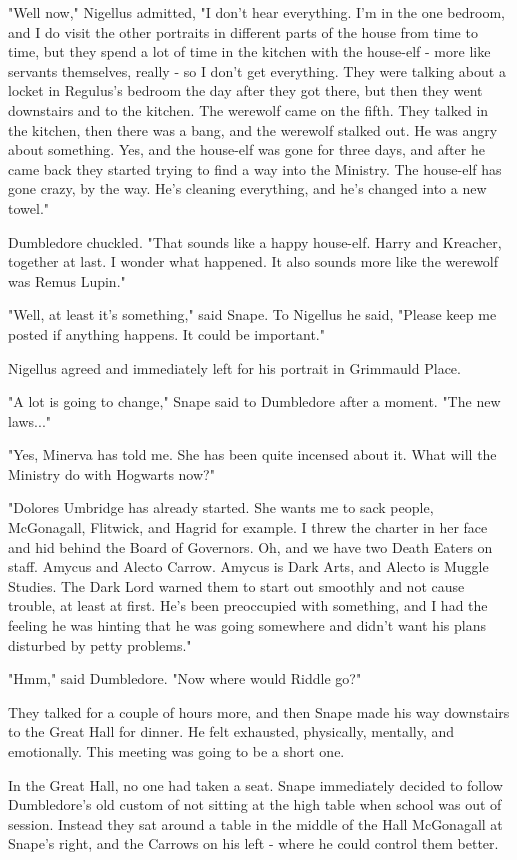 \documentclass[a4paper,11pt]{article}
\begin{document}
"Well now," Nigellus admitted, "I don't hear everything. I'm in the one bedroom, and I do visit the other portraits in different parts of the house from time to time, but they spend a lot of time in the kitchen with the house-elf - more like servants themselves, really - so I don't get everything. They were talking about a locket in Regulus's bedroom the day after they got there, but then they went downstairs and to the kitchen. The werewolf came on the fifth. They talked in the kitchen, then there was a bang, and the werewolf stalked out. He was angry about something. Yes, and the house-elf was gone for three days, and after he came back they started trying to find a way into the Ministry. The house-elf has gone crazy, by the way. He's cleaning everything, and he's changed into a new towel."

Dumbledore chuckled. "That sounds like a happy house-elf. Harry and Kreacher, together at last. I wonder what happened. It also sounds more like the werewolf was Remus Lupin."

"Well, at least it's something," said Snape. To Nigellus he said, "Please keep me posted if anything happens. It could be important."

Nigellus agreed and immediately left for his portrait in Grimmauld Place.

"A lot is going to change," Snape said to Dumbledore after a moment. "The new laws..."

"Yes, Minerva has told me. She has been quite incensed about it. What will the Ministry do with Hogwarts now?"

"Dolores Umbridge has already started. She wants me to sack people, McGonagall, Flitwick, and Hagrid for example. I threw the charter in her face and hid behind the Board of Governors. Oh, and we have two Death Eaters on staff. Amycus and Alecto Carrow. Amycus is Dark Arts, and Alecto is Muggle Studies. The Dark Lord warned them to start out smoothly and not cause trouble, at least at first. He's been preoccupied with something, and I had the feeling he was hinting that he was going somewhere and didn't want his plans disturbed by petty problems."

"Hmm," said Dumbledore. "Now where would Riddle go?"

They talked for a couple of hours more, and then Snape made his way downstairs to the Great Hall for dinner. He felt exhausted, physically, mentally, and emotionally. This meeting was going to be a short one.

In the Great Hall, no one had taken a seat. Snape immediately decided to follow Dumbledore's old custom of not sitting at the high table when school was out of session. Instead they sat around a table in the middle of the Hall McGonagall at Snape's right, and the Carrows on his left - where he could control them better.
\end{document}
